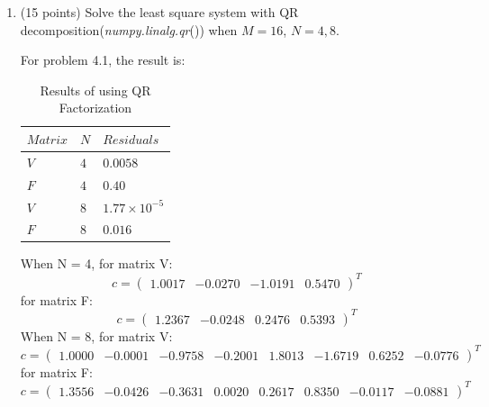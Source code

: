 \documentclass[10pt]{article}
\begin{document}
\begin{enumerate}[label=4.\arabic*]
    \item (15 points)
    Solve the least square system with QR decomposition(\textit{numpy.linalg.qr}()) when $M=16$, $N=4,8$.\par
	For problem 4.1, the result is:\par
	\begin{table}[H]
		\centering
		\begin{tabular}{|l|l|l|}
			\hline
			$Matrix$& $N$ & $Residuals$  \\ \hline
			$V$& $4$ & $0.0058$  \\ \hline
			$F$& $4$ & $0.40$ \\ \hline
			$V$& $8$ & $1.77\times10^{-5}$  \\ \hline
			$F$& $8$ & $0.016$ \\ \hline
		\end{tabular}
		\caption{Results of using QR Factorization}
	\end{table}
	When N = 4, for matrix V: 
	\begin{equation}      
	c=\left(                 
	\begin{array}{cccc}
	1.0017&-0.0270&-1.0191&0.5470   
	\end{array}
	\right)^T              
	\end{equation}
	for matrix F:
	\begin{equation}      
	c=\left(                 
	\begin{array}{cccc}
	1.2367&-0.0248&0.2476&0.5393  
	\end{array}
	\right)^T              
	\end{equation}
	When N = 8, for matrix V: 
	\begin{equation}      
	c=\left(                 
	\begin{array}{ccccccccc}
	1.0000&-0.0001&-0.9758&-0.2001&1.8013&-1.6719&0.6252&-0.0776
	\end{array}
	\right)^T              
	\end{equation}
	for matrix F:
	\begin{equation}      
	c=\left(                 
	\begin{array}{cccccccc}
	1.3556&-0.0426&-0.3631&0.0020&0.2617&0.8350&-0.0117&-0.0881 
	\end{array}
	\right)^T              
	\end{equation}
	\begin{figure}[H]
		\centering

\end{figure}
\end{enumerate}
\end{document}
